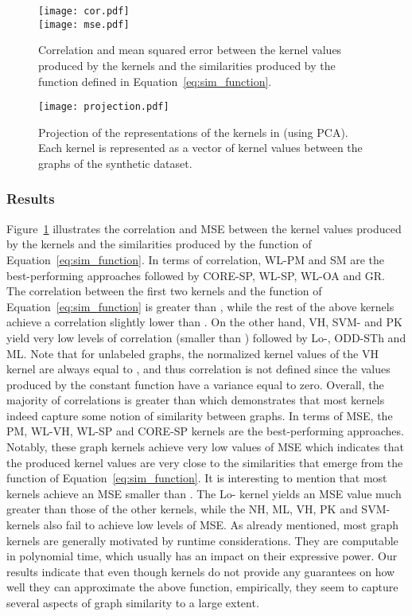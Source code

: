 \documentclass[twoside,11pt]{article}
\begin{document}
\begin{figure}[t]
    \centering
    \subfloat
    {\texttt{[image: cor.pdf]}}\\
    \subfloat
    {\texttt{[image: mse.pdf]}}
    \caption{Correlation and mean squared error between the kernel values produced by the  kernels and the similarities produced by the function defined in Equation~\eqref{eq:sim_function}.}
    \label{fig:cor_mse}
\end{figure}

\begin{figure}[t]
    \centering
    \texttt{[image: projection.pdf]}
    \caption{Projection of the representations of the  kernels in  (using PCA). Each kernel is represented as a vector of kernel values between the graphs of the synthetic dataset.}
    \label{fig:pca_projection}
\end{figure}

\subsubsection{Results}
Figure~\ref{fig:cor_mse} illustrates the correlation and MSE between the kernel values produced by the  kernels and the similarities produced by the function of Equation~\eqref{eq:sim_function}.
In terms of correlation, WL-PM and SM are the best-performing approaches followed by CORE-SP, WL-SP, WL-OA and GR.
The correlation between the first two kernels and the function of Equation~\eqref{eq:sim_function} is greater than , while the rest of the above kernels achieve a correlation slightly lower than .
On the other hand, VH, SVM- and PK yield very low levels of correlation (smaller than ) followed by Lo-, ODD-STh and ML.
Note that for unlabeled graphs, the normalized kernel values of the VH kernel are always equal to , and thus correlation is not defined since the values produced by the constant function have a variance equal to zero.
Overall, the majority of correlations is greater than  which demonstrates that most kernels indeed capture some notion of similarity between graphs.
In terms of MSE, the PM, WL-VH, WL-SP and CORE-SP kernels are the best-performing approaches.
Notably, these graph kernels achieve very low values of MSE which indicates that the produced kernel values are very close to the similarities that emerge from the function of Equation~\ref{eq:sim_function}.
It is interesting to mention that most kernels achieve an MSE smaller than .
The Lo- kernel yields an MSE value much greater than those of the other kernels, while the NH, ML, VH, PK and SVM- kernels also fail to achieve low levels of MSE.
As already mentioned, most graph kernels are generally motivated by runtime considerations.
They are computable in polynomial time, which usually has an impact on their expressive power.
Our results indicate that even though kernels do not provide any guarantees on how well they can approximate the above function, empirically, they seem to capture several aspects of graph similarity to a large extent. 
\end{document}

